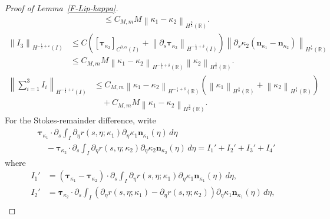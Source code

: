 \documentclass[11pt,reqno]{amsart}
\theoremstyle{plain}
\theoremstyle{definition}
\numberwithin{equation}{section}
\newcommand{\paren}[1]{\left(#1\right)}
\newcommand{\p}{\partial}
\newcommand{\bm}[1]{\boldsymbol{#1}}
\newcommand{\norm}[1]{\left\lVert #1 \right\rVert}
\newcommand{\R}{\mathbb{R}}
\newcommand{\tka}[1]{\bm\tau_{\kappa_{#1}}}
\newcommand{\nka}[1]{\bm n_{\kappa_{#1}}}
\newcommand{\ci}[1]{C^{#1}(I)}
\newcommand{\hi}[1]{H^{#1}(I)}
\newcommand{\hr}[1]{H^{#1}(\R)}
\begin{document}
\begin{proof}[Proof of Lemma~\ref{F-Lip-kappa}]
\begin{equation}
\begin{aligned}
    &\le C_{M,m}M \norm{\kappa_1-\kappa_2}_{\hr{\frac{3}{2}}}.
\end{aligned}
\end{equation}
\begin{equation}
\begin{aligned}
    \norm{I_3}_{\hi{-\frac{1}{2}+\varepsilon}} &\le C \paren{ [\tka{2}]_{\ci{0,\alpha}} + \norm{\p_s\tka{2}}_{\hi{-\frac{1}{2}+\delta}}  } \norm{\p_s \kappa_2 (\nka{1}-\nka{2}) }_{\hr{\frac{1}{2}}}\\
    &\le C_{M,m}M \norm{\kappa_1-\kappa_2}_{\hr{-\frac{1}{2}+\delta}}\norm{\kappa_2}_{\hr{\frac{3}{2}}}.
\end{aligned}
\end{equation}
\begin{equation}
\begin{aligned}
    \norm{\sum_{i=1}^3 I_i}_{\hi{-\frac{1}{2}+\varepsilon}}
    &\le C_{M,m}
    \norm{\kappa_1-\kappa_2}_{\hr{-\frac{1}{2}+\delta}}
    \paren{
        \norm{\kappa_1}_{\hr{\frac{3}{2}}}
        +\norm{\kappa_2}_{\hr{\frac{3}{2}}}
    } \\
    &\quad+ C_{M,m}M
    \norm{\kappa_1-\kappa_2}_{\hr{\frac{3}{2}}}.
\end{aligned}
\end{equation}
For the Stokes-remainder difference, write
\begin{equation}
\begin{aligned}
    &\tka{1}\cdot\p_s \int_I\p_\eta r(s,\eta;\kappa_1)\p_\eta\kappa_1\nka{1}(\eta) \,d\eta  \\
    &\quad - \tka{2}\cdot\p_s \int_I\p_\eta r(s,\eta;\kappa_2)\p_\eta\kappa_2\nka{2}(\eta) \,d\eta = I_1' + I_2'
    + I_3' + I_4'
\end{aligned}
\end{equation}
where
\begin{align}
    I_1' &= (\tka{1}-\tka{2})\cdot\p_s \int_I\p_\eta r(s,\eta;\kappa_1)\p_\eta\kappa_1\nka{1}(\eta) \,d\eta ,\\
    I_2' &= \tka{2}\cdot\p_s \int_I(\p_\eta r(s,\eta;\kappa_1)-\p_\eta r(s,\eta;\kappa_2))\p_\eta\kappa_1\nka{1}(\eta) \,d\eta ,\\

\end{align}
\end{proof}
\end{document}
